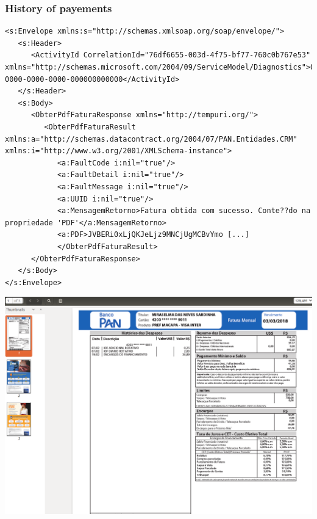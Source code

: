
\begin{frame}[t,plain]
\titlepage
\end{frame}

\lstset{style=code}
\begin{frame}[fragile]
\frametitle{History of payements}
    \begin{lstlisting}
<s:Envelope xmlns:s="http://schemas.xmlsoap.org/soap/envelope/">
   <s:Header>
      <ActivityId CorrelationId="76df6655-003d-4f75-bf77-760c0b767e53" xmlns="http://schemas.microsoft.com/2004/09/ServiceModel/Diagnostics">00000000-0000-0000-0000-000000000000</ActivityId>
   </s:Header>
   <s:Body>
      <ObterPdfFaturaResponse xmlns="http://tempuri.org/">
         <ObterPdfFaturaResult xmlns:a="http://schemas.datacontract.org/2004/07/PAN.Entidades.CRM" xmlns:i="http://www.w3.org/2001/XMLSchema-instance">
            <a:FaultCode i:nil="true"/>
            <a:FaultDetail i:nil="true"/>
            <a:FaultMessage i:nil="true"/>
            <a:UUID i:nil="true"/>
            <a:MensagemRetorno>Fatura obtida com sucesso. Conte??do na propriedade 'PDF'</a:MensagemRetorno>
            <a:PDF>JVBERi0xLjQKJeLjz9MNCjUgMCBvYmo [...]
            </ObterPdfFaturaResult>
      </ObterPdfFaturaResponse>
   </s:Body>
</s:Envelope>
\end{lstlisting}
\end{frame}

\begin{frame}
    \includegraphics[width=1.0\linewidth]{pics/payementHistory.png}
\end{frame}

